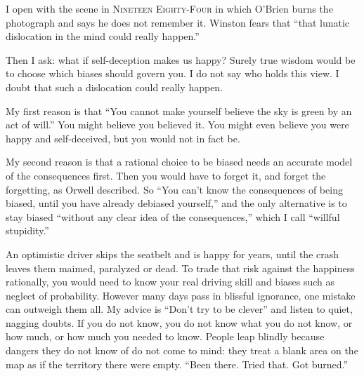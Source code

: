 
I open with the scene in \textsc{Nineteen Eighty-Four} in which O'Brien burns the photograph and says he does not remember it. Winston fears that ``that lunatic dislocation in the mind could really happen.''

Then I ask: what if self-deception makes us happy? Surely true wisdom would be to choose which biases should govern you. I do not say who holds this view.  I doubt that such a dislocation could really happen.

My first reason is that ``You cannot make yourself believe the sky is green by an act of will.'' You might believe you believed it. You might even believe you were happy and self-deceived, but you would not in fact be. 

My second reason is that a rational choice to be biased needs an accurate model of the consequences first. Then you would have to forget it, and forget the forgetting, as Orwell described. So ``You can't know the consequences of being biased, until you have already debiased yourself,'' and the only alternative is to stay biased ``without any clear idea of the consequences,'' which I call ``willful stupidity.'' 

An optimistic driver skips the seatbelt and is happy for years, until the crash leaves them maimed, paralyzed or dead. To trade that risk against the happiness rationally, you would need to know your real driving skill and biases such as neglect of probability. However many days pass in blissful ignorance, one mistake can outweigh them all.  My advice is ``Don't try to be clever'' and listen to quiet, nagging doubts. If you do not know, you do not know what you do not know, or how much, or how much you needed to know. People leap blindly because dangers they do not know of do not come to mind: they treat a blank area on the map as if the territory there were empty. ``Been there. Tried that. Got burned.''


